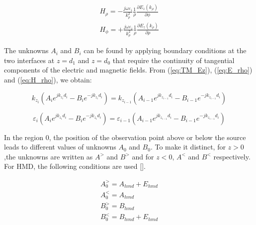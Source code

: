 \documentclass{article}
\begin{document}
  \begin{subequations}
    \begin{align}
      H_{\rho} = -\frac{j\omega \varepsilon_i}{k_{\rho}^2} \frac{1}{\rho}\frac{\partial E_z(k_\rho)}{\partial \phi}
      \label{eq:H_rho} \\
      H_{\phi} =  +\frac{j\omega \varepsilon_i}{k_{\rho}^2} \frac{1}{\rho} \frac{\partial E_z(k_\rho)}{\partial \rho}
      \label{eq:H_phi}
    \end{align}
    \label{eq:H_fields}
  \end{subequations}

  The unknowns $A_i$ and $B_i$ can be found by applying boundary conditions at the two interfaces at $z = d_1$ and $z=d_0$ that require the continuity of tangential components of the electric and magnetic fields. From (\ref{eq:TM_Ez}), (\ref{eq:E_rho}) and (\ref{eq:H_rho}), we obtain:

  \begin{equation}
    k_{z_i} \left( A_i e^{jk_{z_i} d_i} - B_i e^{-jk_{z_i} d_i}  \right) = k_{z_{i-1}} \left( A_{i-1} e^{jk_{z_{i-1}} d_i} - B_{i-1} e^{-jk_{z_{i-1}} d_i}  \right)
    \label{eq:E_rho_BC}
  \end{equation}

  \begin{equation}
    \varepsilon_i \left( A_i e^{jk_{z_i} d_i} - B_i e^{-jk_{z_i} d_i}  \right) = \varepsilon_{i-1} \left( A_{i-1} e^{jk_{z_{i-1}} d_i} - B_{i-1} e^{-jk_{z_{i-1}} d_i}  \right)
    \label{eq:H_rho_BC}
  \end{equation}

  In the region 0, the position of the observation point above or below the source leads to different values of unknowns $A_0$ and $B_0$. To make it distinct, for $z>0$,the unknowns are written as $A^>$ and $B^>$ and for $z<0$, $A^<$ and $B^<$ respectively. For HMD, the following conditions are used [\cite{kong1990electromagnetic}].

  \begin{subequations}
    \begin{align}
      A_0^> = A_{hmd} + E_{hmd} \\
      A_0^< = A_{hmd}
      \label{eq:A_0} \\
      B_0^> = B_{hmd} \\
      B_0^< = B_{hmd} + E_{hmd}
      \label{eq:B_0}
    \end{align}
    \label{eq:hmd}
  \end{subequations}
\end{document}
